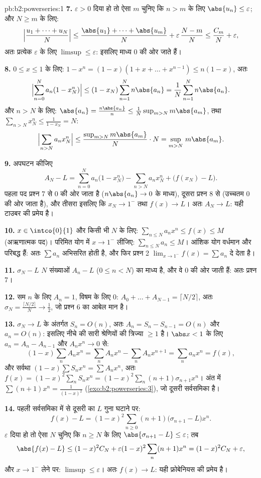 \begin{solution}{pb:b2:powerseries:1}
\textbf{7.} $\varepsilon > 0$ दिया हो तो ऐसा $m$ चुनिए कि $n > m$ के लिए $\abs{u_n}
\leq \varepsilon$; और $N \geq m$ के
लिए:
\[
\Bigl|\frac{u_1 + \dots + u_N}{N}\Bigr|
\leq \frac{\abs{u_1} + \dots + \abs{u_m}}{N} +
\varepsilon\,\frac{N - m}{N}
\leq \frac{C_m}{N} + \varepsilon,
\]
अतः प्रत्येक $\varepsilon$ के लिए $\limsup \leq \varepsilon$: इसलिए माध्य $0$ की ओर जाते हैं।

\textbf{8.} $0 \leq x \leq 1$ के लिए: $1 - x^n = (1-x)(1 + x +
\dots + x^{n-1}) \leq n(1-x)$, अतः
\[
\Bigl|\sum_{n=0}^N a_n(1 - x_N^n)\Bigr|
\leq (1 - x_N)\sum_{n=1}^N n\abs{a_n}
= \frac1N\sum_{n=1}^{N}n\abs{a_n} .
\]
और $n > N$ के लिए: $\abs{a_n} = \frac{n\abs{a_n}}{n} \leq
\frac{1}{N}\sup_{m>N}m\abs{a_m}$, तथा $\sum_{n>N}x_N^n \leq
\frac{1}{1 - x_N} = N$:
\[
\Bigl|\sum_{n>N}a_nx_N^n\Bigr|
\leq \frac{\sup_{m>N}m\abs{a_m}}{N}\cdot N
= \sup_{m>N}\,m\abs{a_m} .
\]

\textbf{9.} अपघटन कीजिए
\[
A_N - L = \sum_{n=0}^{N}a_n\bigl(1 - x_N^n\bigr)
- \sum_{n>N}a_nx_N^n + \bigl(f(x_N) - L\bigr) .
\]
पहला पद प्रश्न 7 से $0$ की ओर जाता है ($n\abs{a_n} \to 0$ के माध्य), दूसरा प्रश्न 8 से
(उच्चतम $0$ की ओर जाता है), और तीसरा इसलिए कि $x_N \to 1^-$ तथा $f(x) \to L$। अतः $A_N \to L$: यही
टाउबर की प्रमेय है।

\textbf{10.} $x \in \intco{0}{1}$ और किसी भी $N$ के लिए: $\sum_{n\leq N}a_nx^n \leq f(x) \leq M$ (अऋणात्मक पद)। परिमित योग में
$x \to 1^-$ लीजिए: $\sum_{n\leq N}a_n \leq M$। आंशिक योग वर्धमान और परिबद्ध हैं: अतः $\sum a_n$ अभिसरित होती है,
और फिर प्रश्न 2 $\lim_{x\to1^-}f(x) =
\sum a_n$ दे देता है।

\textbf{11.} $\sigma_N - L$ $N$ संख्याओं $A_n - L$ ($0 \leq n < N$) का माध्य है, और वे $0$ की ओर जाती
हैं: अतः प्रश्न 7।

\textbf{12.} सम $n$ के लिए $A_n = 1$, विषम के लिए $0$: $A_0 + \dots
+ A_{N-1} = \lceil N/2\rceil$, अतः $\sigma_N =
\frac{\lceil N/2\rceil}{N} \to \frac12$, जो प्रश्न
6 का आबेल मान है।

\textbf{13.} $\sigma_N \to L$ के अंतर्गत $S_n = O(n)$, अतः $A_n = S_n - S_{n-1} = O(n)$ और $a_n = O(n)$: इसलिए नीचे की सारी
श्रेणियों की त्रिज्या $\geq 1$ है। $\abs x < 1$ के लिए $a_n = A_n -
A_{n-1}$ और $A_nx^n \to 0$ से:
\[
(1-x)\sum_n A_nx^n = \sum_n A_nx^n - \sum_n A_nx^{n+1}
= \sum_n a_nx^n = f(x),
\]
और सर्वथा $(1-x)\sum S_nx^n = \sum A_nx^n$, अतः $f(x) =
(1-x)^2\sum_n S_nx^n = (1-x)^2\sum_n(n+1)\sigma_{n+1}x^n$। अंत में $\sum(n+1)x^n = \frac{1}{(1-x)^2}$ (\cref{exo:b2:powerseries:3}), जो दूसरी सर्वसमिका है।

\textbf{14.} पहली सर्वसमिका में से दूसरी का $L$ गुना घटाने पर:
\[
f(x) - L = (1-x)^2\sum_{n\geq0}(n+1)
\bigl(\sigma_{n+1} - L\bigr)x^n .
\]
$\varepsilon$ दिया हो तो ऐसा $N$ चुनिए कि $n \geq N$ के लिए $\abs{\sigma_{n+1} - L}
\leq \varepsilon$; तब
\[
\abs{f(x) - L} \leq (1-x)^2 C_N +
\varepsilon(1-x)^2\sum_{n}(n+1)x^n
= (1-x)^2C_N + \varepsilon ,
\]
और $x \to 1^-$ लेने पर: $\limsup \leq \varepsilon$। अतः $f(x) \to L$: यही फ्रोबेनियस की प्रमेय है।


\end{solution}
